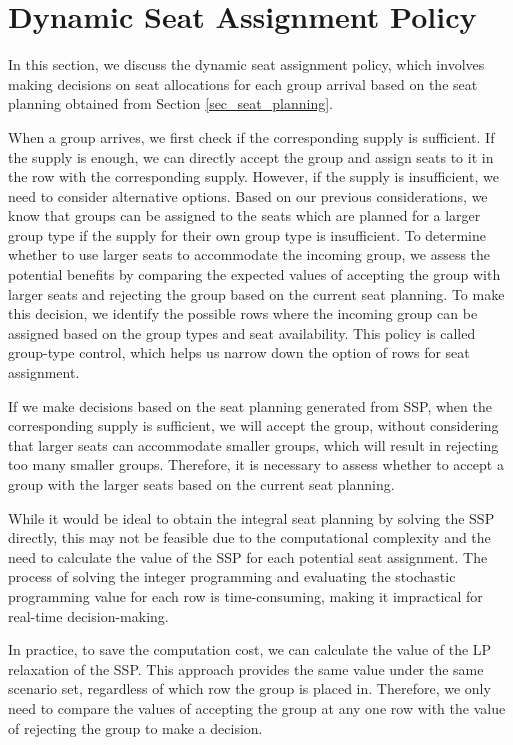 \section{Dynamic Seat Assignment Policy}\label{sec_dynamic}
In this section, we discuss the dynamic seat assignment policy, which involves making decisions on seat allocations for each group arrival based on the seat planning obtained from Section \ref{sec_seat_planning}.

When a group arrives, we first check if the corresponding supply is sufficient. If the supply is enough, we can directly accept the group and assign seats to it in the row with the corresponding supply. However, if the supply is insufficient, we need to consider alternative options. Based on our previous considerations, we know that groups can be assigned to the seats which are planned for a larger group type if the supply for their own group type is insufficient. To determine whether to use larger seats to accommodate the incoming group, we assess the potential benefits by comparing the expected values of accepting the group with larger seats and rejecting the group based on the current seat planning.
To make this decision, we identify the possible rows where the incoming group can be assigned based on the group types and seat availability. This policy is called group-type control, which helps us narrow down the option of rows for seat assignment.

If we make decisions based on the seat planning generated from SSP, when the corresponding supply is sufficient, we will accept the group, without considering that larger seats can accommodate smaller groups, which will result in rejecting too many smaller groups. Therefore, it is necessary to assess whether to accept a group with the larger seats based on the current seat planning. 

While it would be ideal to obtain the integral seat planning by solving the SSP directly, this may not be feasible due to the computational complexity and the need to calculate the value of the SSP for each potential seat assignment. The process of solving the integer programming and evaluating the stochastic programming value for each row is time-consuming, making it impractical for real-time decision-making.

In practice, to save the computation cost, we can calculate the value of the LP relaxation of the SSP. This approach provides the same value under the same scenario set, regardless of which row the group is placed in. Therefore, we only need to compare the values of accepting the group at any one row with the value of rejecting the group to make a decision.

